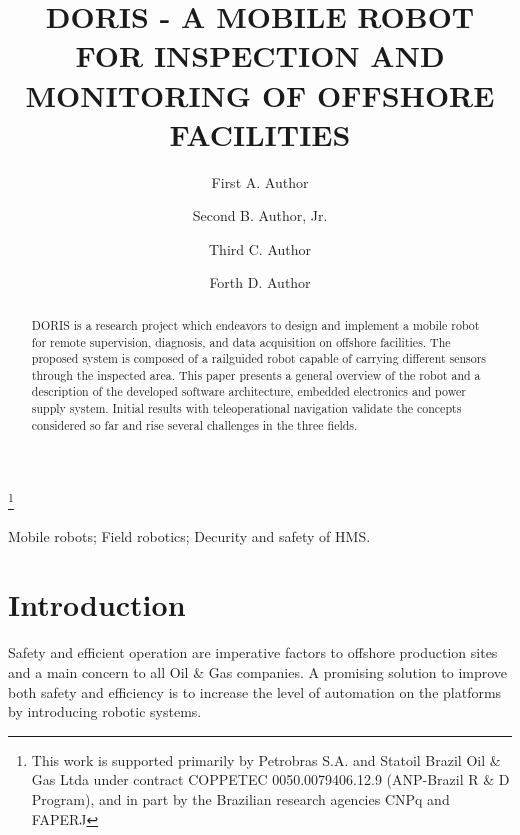 \documentclass{ifacconf}
\begin{document}
\begin{frontmatter}

\title{DORIS - A MOBILE ROBOT FOR INSPECTION AND MONITORING OF
OFFSHORE FACILITIES} 

\thanks[footnoteinfo]{This work is supported primarily by Petrobras S.A. and
Statoil Brazil Oil \& Gas Ltda under contract COPPETEC 0050.0079406.12.9
(ANP-Brazil R \& D Program), and in part by the Brazilian research agencies CNPq
and FAPERJ}

\author[First]{First A. Author} 
\author[Second]{Second B. Author, Jr.} 
\author[Third]{Third C. Author}
\author[Forth]{Forth D. Author}

\address[First]{Research and Development Center, Petrobras/CENPES, Rio de
Janeiro, Brazil} 
\address[Second]{Mathematical Sciences and Technology Department, Norwegian
University of Life Sciences, Oslo, Norwegian }
\address[Third]{Electrical
Engineering Department, COPPE UFRJ, Rio de Janeiro, Brazil, (e-mail: )}
\address[Forth]{TPD RD New Development Solutions, Statoil ASA}

\begin{abstract}                %
DORIS is a research project which endeavors to design and implement a mobile
robot for remote supervision, diagnosis, and data acquisition on offshore
facilities. The proposed system is composed of a railguided robot capable of
carrying different sensors through the inspected area. This paper presents a
general overview of the robot and a description of the developed software
architecture, embedded electronics and power supply system. Initial results
with teleoperational navigation validate the concepts considered so far and
rise several challenges in the three fields.
\end{abstract}

\begin{keyword}
Mobile robots; Field robotics; Decurity and safety of HMS.
\end{keyword}

\end{frontmatter}

\section{Introduction}
Safety and efficient operation are imperative factors to offshore production
sites and a main concern to all Oil \& Gas companies. A promising solution to
improve both safety and efficiency is to increase the level of automation on
the platforms by introducing robotic systems.
\end{document}
